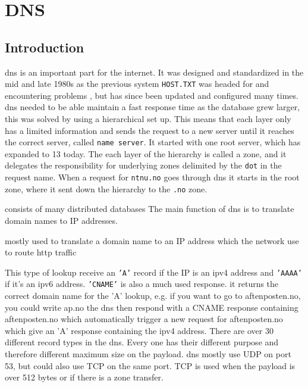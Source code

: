 \chapter{DNS}
\label{chp:dns}

\section{Introduction}

\Gls{dns} is an important part for the internet. It was designed and standardized in the mid and late 1980s as the previous system \texttt{HOST.TXT} was headed for and encountering problems \cite{Mockapetris:1988:DDN:52324.52338}, but has since been updated and configured many times. \Gls{dns} needed to be able maintain a fast response time as the database grew larger, this was solved by using a hierarchical set up. This means that each layer only has a limited information and sends the request to a new server until it reaches the correct server, called \texttt{name server}. It started with one root server, which has expanded to 13 today. The each layer of the hierarchy is called a zone, and it delegates the responsibility for underlying zones delimited by the \texttt{dot} in the request name. When a request for \texttt{ntnu.no} goes through \Gls{dns} it starts in the root zone, where it sent down the hierarchy to the \texttt{.no} zone.





consists of many distributed databases 
The main function of \Gls{dns} is to translate domain names to IP addresses. 

 mostly used to translate a domain name to an IP address which the network use to route http traffic


This type of lookup receive an \texttt{'A'} record if the IP is an ipv4 address and \texttt{'AAAA'} if it's an ipv6 address. \texttt{'CNAME'} is also a much used response. it returns the correct domain name for the 'A' lookup, e.g. if you want to go to aftenposten.no, you could write ap.no the \Gls{dns} then respond with a CNAME response containing aftenposten.no which automatically trigger a new request for aftenposten.no which give an 'A' response containing the ipv4 address. There are over 30 different record types in the \Gls{dns}. Every one has their different purpose and therefore different maximum size on the payload. \Gls{dns} mostly use UDP on port 53, but could also use TCP on the same port. TCP is used when the payload is over 512 bytes or if there is a zone transfer. 

